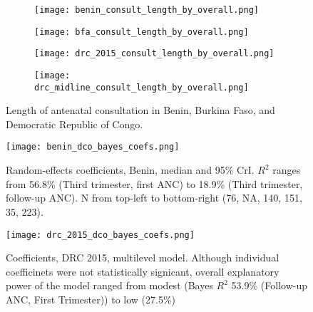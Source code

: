 \documentclass{article}
\begin{document}
\begin{figure}[p]
  \centering
  \begin{subfigure}[b]{0.45\textwidth}
    \texttt{[image: benin\_consult\_length\_by\_overall.png]}
    \subcaption{}
  \end{subfigure}   
  \hfill 
  \begin{subfigure}[b]{0.45\textwidth}
    \texttt{[image: bfa\_consult\_length\_by\_overall.png]}
    \subcaption{}
  \end{subfigure}

  \begin{subfigure}[b]{0.45\textwidth}
    \texttt{[image: drc\_2015\_consult\_length\_by\_overall.png]}
    \subcaption{}
  \end{subfigure}
  \hfill
  \begin{subfigure}[b]{0.45\textwidth}
    \texttt{[image: drc\_midline\_consult\_length\_by\_overall.png]}
    \subcaption{}
  \end{subfigure}   
  \caption{Length of antenatal consultation in Benin, Burkina Faso, and Democratic Republic of Congo.}
  \label{fig:anc length}
\end{figure}


\begin{figure}[p]
  \captionsetup{singlelinecheck=off}
  \centering
  \texttt{[image: benin\_dco\_bayes\_coefs.png]}
  \caption{Random-effects coefficients, Benin, median and 95\% CrI. $R^2$ ranges from 56.8\% (Third trimester, first ANC) to 18.9\% (Third trimester, follow-up ANC). N from top-left to bottom-right (76, NA, 140, 151, 35, 223).}
  \label{fig:benin dco lm}
\end{figure}


\begin{figure}[p]
  \captionsetup{singlelinecheck=off}
  \centering
  \texttt{[image: drc\_2015\_dco\_bayes\_coefs.png]}
  \caption{Coefficients, DRC 2015, multilevel model. Although individual coefficinets were not statistically signicant, overall explanatory power of the model ranged from
    modest (Bayes $R^2$ 53.9\% (Follow-up ANC, First Trimester)) to low (27.5\%)}
  \label{fig:drc 2015 dco lm}
\end{figure} 
\end{document}

